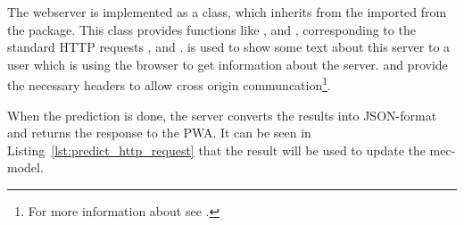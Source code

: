 The webserver is implemented as a  class, which inherits from the  imported from the  package.
This class provides functions like ,  and , corresponding to the standard HTTP requests ,  and .
 is used to show some text about this server to a user which is using the browser to get information about the server.
 and  provide the necessary headers to allow cross origin communcation\footnote{For more information about  see .}.

When the prediction is done, the server converts the results into JSON-format and returns the response to the PWA.
It can be seen in Listing~\ref{lst:predict_http_request} that the result will be used to update the mec-model.

